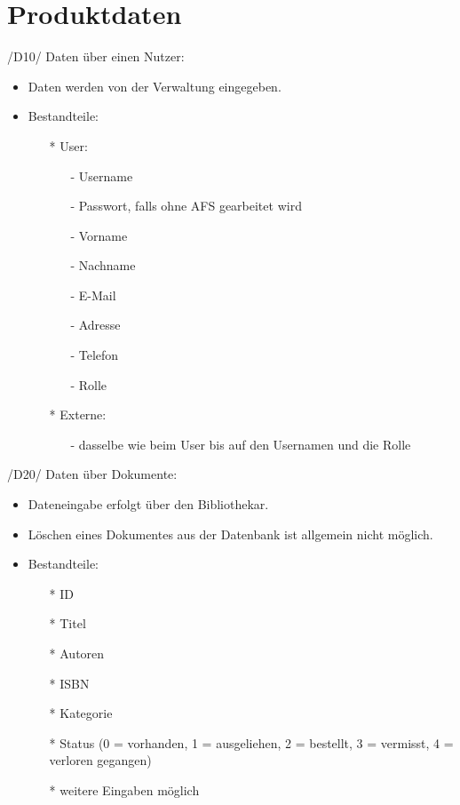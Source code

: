 
\chapter{Produktdaten}
/D10/ Daten über einen Nutzer:
\begin{itemize}
  \item Daten werden von der Verwaltung eingegeben.
  \item Bestandteile:
  \begin{itemize}
    \item[*] User:
    \begin{itemize}
      \item[-] Username
      \item[-] Passwort, falls ohne AFS gearbeitet wird
      \item[-] Vorname
      \item[-] Nachname
      \item[-] E-Mail
      \item[-] Adresse
      \item[-] Telefon
      \item[-] Rolle
    \end{itemize}
    \item[*] Externe:
    \begin{itemize}
      \item[-] dasselbe wie beim User bis auf den Usernamen und die Rolle
    \end{itemize}
  \end{itemize}
\end{itemize}

\newpage

/D20/ Daten über Dokumente:
\begin{itemize}
  \item Dateneingabe erfolgt über den Bibliothekar.
  \item Löschen eines Dokumentes aus der Datenbank ist allgemein nicht möglich.
  \item Bestandteile:
  \begin{itemize}
    \item[*] ID
    \item[*] Titel
    \item[*] Autoren
    \item[*] ISBN
    \item[*] Kategorie
    \item[*] Status (0 = vorhanden, 1 = ausgeliehen, 2 = bestellt, 3 = vermisst, 4 = verloren gegangen)
    \item[*] weitere Eingaben möglich
  \end{itemize}
\end{itemize}

